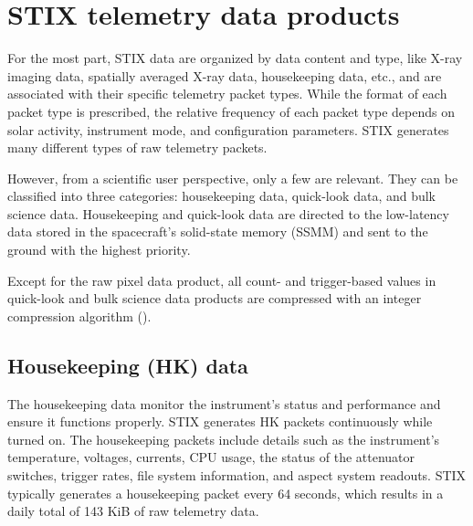 \documentclass[referee]{aa} %
\begin{document}
\section{STIX telemetry data products}
\label{sec:raw-data}
For the most part, STIX data are organized by data content and type, like X-ray imaging data, spatially averaged X-ray data, housekeeping data, etc., and are associated with their specific telemetry packet types. While the format of each packet type is prescribed, the relative frequency of each packet type depends on solar activity, instrument mode, and configuration parameters. STIX generates many different types of raw telemetry packets.

However, from a scientific user perspective, only a few are relevant. They can be classified into three categories: housekeeping data, quick-look data, and bulk science data.
Housekeeping and quick-look data are directed to the low-latency data stored in the spacecraft's solid-state memory (SSMM) and sent to the ground with the highest priority.

Except for the raw pixel data product, all count- and trigger-based values in quick-look and bulk science data products are compressed with an integer compression algorithm (\cite{stixinstrument}).

\subsection{Housekeeping (HK) data}
 The housekeeping data monitor the instrument's status and performance and ensure it functions properly. STIX generates HK packets continuously while turned on. The housekeeping packets include details such as the instrument's temperature, voltages, currents, CPU usage, the status of the attenuator switches, trigger rates, file system information, and aspect system readouts. STIX typically generates a  housekeeping packet every 64 seconds, which results in a daily total of 143 KiB of raw telemetry data.
 
\end{document}
